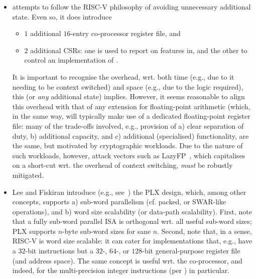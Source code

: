 \documentclass{article}
\begin{document}
\begin{itemize}

\item \ISE attempts to follow the RISC-V philosophy of avoiding unnecessary 
      additional state.  Even so, it does introduce

      \begin{itemize}
      \item $1$ additional $16$-entry co-processor register file,
            and
      \item $2$ additional CSRs: one is used to report on features in, and 
            the other to control an implementation of \ISE.
      \end{itemize}

      \noindent
      It is important to recognise 
      the overhead, wrt. both 
      time (e.g., due to it needing to be context switched) 
      and 
      space (e.g., due to the logic required),
      this (or {\em any} additional state) implies.
      However, it seems reasonable to align this overhead with that of any
      extension for floating-point arithmetic (which, in the same way, will
      typically make use of a dedicated floating-point register file: many 
      of the trade-offs involved, e.g., provision of
      a) clear separation of duty,
      b) additional capacity,
         and
      c) additional (specialised) functionality,
      are the same, but motivated by cryptographic workloads.
      Due to the nature of such workloads, however, attack vectors such as
      LazyFP~\cite{SCARV:StePre:18}, which capitalises on a short-cut wrt. 
      the overhead of context switching, {\em must} be robustly mitigated.

\item Lee and Fiskiran introduce (e.g., see~\cite{SCARV:LeeFis:05}) the PLX
      design, which, among other concepts, supports 
      a) sub-word parallelism (cf. packed, or SWAR-like operations),
         and
      b) word size scalability (or data-path scalability).
      First, 
      note that a fully sub-word parallel ISA is orthogonal wrt. all useful
      sub-word sizes; PLX supports $n$-byte sub-word sizes for sane $n$.
      Second,
      note that, in a sense, RISC-V is word size scalable: it can cater for
      implementations that, e.g., have a $32$-bit instructions but a $32$-,
      $64$-, or $128$-bit general-purpose register file (and address space).
      The same concept is useful wrt. the co-processor, and indeed, for the
      multi-precision integer instructions (per )
      in particular.


\end{itemize}
\end{document}
